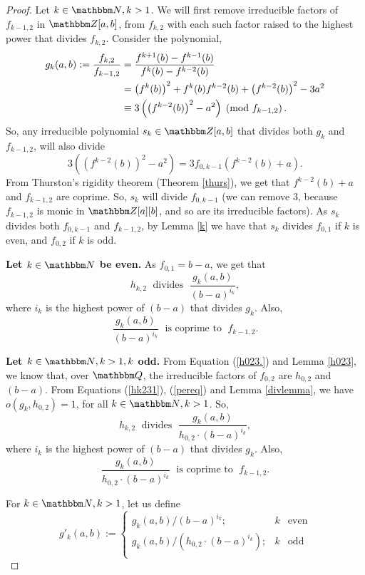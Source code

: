 \documentclass[reqno]{amsart}
\renewcommand{\eqref}[1]{(\ref{#1})}
\numberwithin{equation}{section}
\theoremstyle{plain}
\theoremstyle{definition}
\theoremstyle{definition}
\newcommand{\Q}{{\mathbbm Q}}
\newcommand{\Z}{{\mathbbm Z}}
\newcommand{\N}{{\mathbbm N}}
\begin{document}
    \begin{proof}
        Let $k\in \N, k > 1$. We will first remove irreducible factors of $f_{k-1,2}$ in $\Z[a,b]$, from $f_{k,2}$ with each such factor raised to the highest power that divides $f_{k,2}$.
        Consider the polynomial, 
        \begin{align}\label{hk231}
             g_{k}(a,b):= \frac{f_{k,2}}{f_{k-1,2}} & = \frac{f^{k+1}(b)-f^{k-1}(b)}{f^{k}(b)-f^{k-2}(b)}\notag \\
             & = \left(f^{k}(b)\right)^{2}+f^{k}(b)f^{k-2}(b)+\left(f^{k-2}(b)\right)^{2}- 3a^{2}\notag \\
             & \equiv 3\left(\left(f^{k-2}(b)\right)^{2}-a^{2}\right)\; \left( \text{mod } f_{k-1,2}\right).
        \end{align}
        So, any irreducible polynomial $s_{k}\in \Z[a,b]$ that divides both $g_{k}$ and $f_{k-1,2}$, will also divide 
        \begin{equation}\label{pereq}
            3\left((f^{k-2}(b))^{2}-a^{2}\right)=3 f_{0,k-1} (f^{k-2}(b)+a).
        \end{equation}
        From Thurston's rigidity theorem (Theorem \ref{thurs}), we get that $f^{k-2}(b)+a$  and $f_{k-1,2}$ are coprime. So, $s_{k}$ will divide $f_{0,k-1}$ (we can remove $3$, because $f_{k-1,2}$ is monic in $\Z[a][b]$, and so are its irreducible factors). As $s_{k}$ divides both $f_{0,k-1}$ and $f_{k-1,2}$, by Lemma \ref{k} we have that $s_{k}$ divides $f_{0,1}$ if $k$ is even, and $f_{0,2}$ if $k$ is odd.

        \textbf{Let $k\in \N$ be even.} As $f_{0,1}= b-a$, we get that 
        $$h_{k,2}\; \text{ divides }\; \frac{g_{k}(a,b)}{(b-a)^{i_{k}}},$$ where $i_{k}$ is the highest power of $(b-a)$ that divides $g_{k}$. Also, 
        $$\frac{g_{k}(a,b)}{(b-a)^{i_{k}}}\;\text{ is coprime to }\;f_{k-1,2}.$$

        \textbf{Let $k\in \N, k>1, k$ odd.} 
        From Equation \eqref{h023.} and Lemma \ref{h023}, we know that, over $\Q$, the irreducible factors of $f_{0,2}$ are $h_{0,2}$ and $(b-a)$. From Equations \eqref{hk231}, \eqref{pereq} and Lemma \ref{divlemma}, we have $o(g_{k},h_{0,2})=1$, for all $k\in \N, k>1$. So, 
        $$h_{k,2}\; \text{ divides }\; \frac{g_{k}(a,b)}{h_{0,2}\cdot (b-a)^{i_{k}}},$$ 
        where $i_{k}$ is the highest power of $(b-a)$ that divides $g_{k}$. Also,
        $$\frac{g_{k}(a,b)}{h_{0,2}\cdot (b-a)^{i_{k}}}\;\text{ is coprime to }\;f_{k-1,2}.$$

        For $k\in \N, k>1$, let us define \begin{equation}\label{hk232}
            g'_{k}(a,b) := \left\{ \begin{array}{rcl}
                g_{k}(a,b)/(b-a)^{i_{k}}; & k &\mbox{even} \\ g_{k}(a,b)/(h_{0,2}\cdot (b-a)^{i_{k}}); & k & \mbox{odd} \\
            \end{array}\right.
        \end{equation}


\end{proof}
\end{document}
